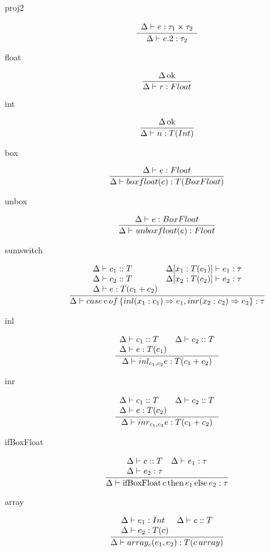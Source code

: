 \documentclass[12pt,twoside,fleqn]{amsart}
\theoremstyle{plain}
\theoremstyle{plain}
\theoremstyle{definition}
\begin{document}
\begin{description}
\item [proj2]
\[
\frac{\begin{array}{ll}
\Delta  \vdash e  :\tau _{1}\times \tau _{2} 
\end{array} }{\Delta  \vdash e.2  :\tau _{2}  }\]

\item [float]
\[
\frac{\Delta  \, \mathrm{ok} }{\Delta  \vdash r  :Float  }\]

\item [int]
\[
\frac{\Delta  \, \mathrm{ok} }{\Delta  \vdash n  :T(Int)  }\]

\item [box]
\[
\frac{\Delta  \vdash e  :Float  }{\Delta  \vdash boxfloat(e )  :T(BoxFloat)  }\]

\item [unbox]
\[
\frac{\Delta  \vdash e  :BoxFloat  }{\Delta  \vdash unboxfloat(e )  :Float  }\]

\item [sumswitch]
\[
\frac{\begin{array}{ll}
\Delta  \vdash c_{1}  ::T  & \Delta  [x_{1}  :T(c_{1})  ] \vdash e_{1} :\tau \\
\Delta  \vdash c_{2}  ::T  & \Delta  [x_{2}  :T(c_{2})  ] \vdash e_{2} :\tau \\
\Delta  \vdash e  :T(c_{1}+c_{2})  & 
\end{array} }{\Delta  \vdash case\, e \, of\, \{inl(x_{1} :c_{1} )\Rightarrow e_{1} ,inr(x_{2} :c_{2} )\Rightarrow e_{2} \}  :\tau   }\]

\item [inl]
\[
\frac{\begin{array}{ll}
\Delta  \vdash c_{1}  ::T  & \Delta  \vdash c_{2} ::T\\
\Delta  \vdash e  :T(c_{1})  & 
\end{array} }{\Delta  \vdash inl_{c_{1} ,c_{2} }e  :T(c_{1}+c_{2})  }\]

\item [inr]
\[
\frac{\begin{array}{ll}
\Delta  \vdash c_{1}  ::T  & \Delta  \vdash c_{2} ::T\\
\Delta  \vdash e  :T(c_{2})  & 
\end{array} }{\Delta  \vdash inr_{c_{1} ,c_{2} }e  :T(c_{1}+c_{2})  }\]

\item [ifBoxFloat]
\[
\frac{\begin{array}{ll}
\Delta  \vdash c  ::T  & \Delta  \vdash e_{1}  :\tau  \\
\Delta  \vdash e_{2}  :\tau   & 
\end{array} }{\Delta  \vdash \mathrm{ifBoxFloat}\, c \, \mathrm{then}\, e_{1} \, \mathrm{else}\, e_{2}  :\tau   }\]

\item [array]
\[
\frac{\begin{array}{ll}
\Delta  \vdash e_{1}  :Int  & \Delta  \vdash c  ::T \\
\Delta  \vdash e_{2}  :T(c)  & 
\end{array} }{\Delta  \vdash array_{c }(e_{1} ,e_{2} )  :T(c \: array ) }\]


\end{description}
\end{document}
